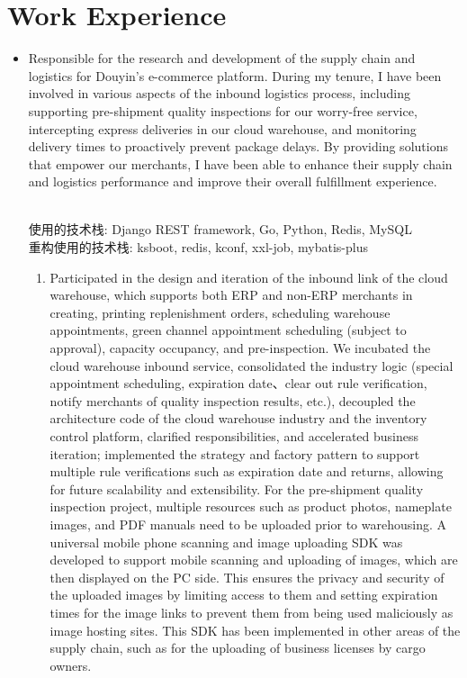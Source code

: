 \documentclass{resume}
\newcommand{\en}[1]{#1}
\newcommand{\zh}[1]{}
\begin{document}
\section{\en{Work Experience}\zh{工作经历}}
\en{}
\zh{\datedsubsection{\textbf{\href{https://www.kuaishou.com/about/}{快手，北京}}}{2022/03 -- 至今}}
\en{}
\zh{\rolewithdate{资源管理平台}{后端开发工程师}{2023/07 -- 至今}}
\begin{itemize}
     \item \en{Responsible for the research and development of the supply chain and logistics for Douyin's e-commerce platform. During my tenure, I have been involved in various aspects of the inbound logistics process, including supporting pre-shipment quality inspections for our worry-free service, intercepting express deliveries in our cloud warehouse, and monitoring delivery times to proactively prevent package delays. By providing solutions that empower our merchants, I have been able to enhance their supply chain and logistics performance and improve their overall fulfillment experience.}
           \zh{负责CMP多云管理平台的研发，期间参与公有云测试流程的设计与实现，华为云的接入，阿里云、腾讯云LB相关产品的接入与研发，同时参与平台运维，确保用户公有云体验优化与平台资源管理高效。}
           \\使用的技术栈: Django REST framework, Go, Python, Redis, MySQL\\
           重构使用的技术栈: ksboot, redis, kconf, xxl-job, mybatis-plus
           \begin{enumerate}
                \item \en{Participated in the design and iteration of the inbound link of the cloud warehouse, which supports both ERP and non-ERP merchants in creating, printing replenishment orders, scheduling warehouse appointments, green channel appointment scheduling (subject to approval), capacity occupancy, and pre-inspection. We incubated the cloud warehouse inbound service, consolidated the industry logic (special appointment scheduling, expiration date、clear out rule verification, notify merchants of quality inspection results, etc.), decoupled the architecture code of the cloud warehouse industry and the inventory control platform, clarified responsibilities, and accelerated business iteration; implemented the strategy and factory pattern to support multiple rule verifications such as expiration date and returns, allowing for future scalability and extensibility. For the pre-shipment quality inspection project, multiple resources such as product photos, nameplate images, and PDF manuals need to be uploaded prior to warehousing. A universal mobile phone scanning and image uploading SDK was developed to support mobile scanning and uploading of images, which are then displayed on the PC side. This ensures the privacy and security of the uploaded images by limiting access to them and setting expiration times for the image links to prevent them from being used maliciously as image hosting sites. This SDK has been implemented in other areas of the supply chain, such as for the uploading of business licenses by cargo owners.}

\end{enumerate}
\end{itemize}
\end{document}
